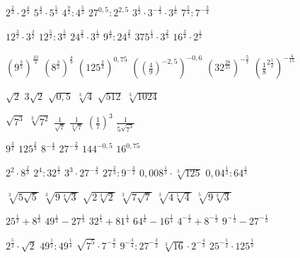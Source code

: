 \documentclass[12pt,a4paper]{article}
\begin{document}
	{$2^{\frac{2}{3}}\cdot 2^{\frac{4}{3}}$}
	{$5^{\frac{4}{3}}\cdot 5^{\frac{5}{3}}$}
	{$4^{\frac{9}{2}}:4^{\frac{5}{2}}$}
	{$27^{0{,}5}:2^{2{,}5}$}
	{$3^{\frac{1}{2}}\cdot 3^{-\frac{1}{3}}\cdot 3^{\frac{1}{6}}$}
	{$7^{\frac{5}{4}}:7^{-\frac{3}{4}}$}
	
	{$12^{\frac{3}{2}}\cdot 3^{\frac{3}{2}}$}
	{$12^{\frac{5}{2}}:3^{\frac{5}{2}}$}
	{$24^{\frac{2}{3}}\cdot 3^{\frac{1}{3}}$}
	{$9^{\frac{4}{3}}:24^{\frac{2}{3}}$}
	{$375^{\frac{1}{3}}\cdot 3^{\frac{2}{3}}$}
	{$16^{\frac{3}{4}}\cdot 2^{\frac{1}{2}}$}
	
	{$\left(9^{\frac{3}{5}}\right)^{\frac{10}{3}}$}
	{$\left(8^{\frac{3}{2}}\right)^{\frac{4}{9}}$}
	{$\left(125^{\frac{2}{3}}\right)^{0{,}75}$}
	{$\left(\left(\frac{4}{9}\right)^{-2{,}5}\right)^{-0{,}6}$}
	{$\left(32^{\frac{28}{25}}\right)^{-\frac{5}{7}}$}
	{$\left(\frac{1}{8}^{2\frac{1}{2}}\right)^{-\frac{4}{15}}$}
	
	\newpage

	{$\sqrt{2}$}
	{$3\sqrt{2}$}
	{$\sqrt{0{,}5}$}
	{$\sqrt[3]{4}$}
	{$\sqrt{512}$}
	{$\sqrt[3]{1024}$}
	
	{$\sqrt{7^3}$}
	{$\sqrt[3]{7^2}$}
	{$\frac{1}{\sqrt{7}}$}
	{$\frac{1}{\sqrt[3]{7}}$}
	{$\left(\frac{1}{7}\right)^3$}
	{$\frac{1}{5\sqrt{7^3}}$}
	
	{$9^{\frac{3}{2}}$}
	{$125^{\frac{2}{3}}$}
	{$8^{-\frac{4}{3}}$}
	{$27^{-\frac{2}{3}}$}
	{$144^{-0{,}5}$}
	{$16^{0{,}75}$}
	
	{$2^2\cdot 8^{\frac{2}{3}}$}
	{$2^4:32^{\frac{1}{5}}$}
	{$3^3\cdot 27^{-\frac{4}{3}}$}
	{$27^{\frac{2}{3}}:9^{-\frac{3}{2}}$}
	{$0{,}008^{\frac{1}{3}}\cdot\sqrt[3]{125}$}
	{$0{,}04^{\frac{1}{2}}:64^{\frac{1}{3}}$}
	
	{$\sqrt[3]{5\sqrt{5}}$}
	{$\sqrt[3]{9\sqrt[4]{3}}$}
	{$\sqrt{2\sqrt[3]{2}}$}
	{$\sqrt[3]{7\sqrt{7}}$}
	{$\sqrt[3]{4\sqrt[5]{4}}$}
	{$\sqrt[5]{9\sqrt[3]{3}}$}
	
	\zadanieDomowe
	
	
	{$25^{\frac{1}{2}}+8^{\frac{1}{3}}$}
	{$49^{\frac{1}{2}}-27^{\frac{1}{3}}$}
	{$32^{\frac{1}{5}}+81^{\frac{1}{4}}$}
	{$64^{\frac{1}{6}}-16^{\frac{1}{4}}$}
	{$4^{-\frac{1}{2}}+8^{-\frac{1}{3}}$}
	{$9^{-\frac{1}{2}}-27^{-\frac{1}{3}}$}
	
	
	{$2^{\frac{5}{2}}\cdot\sqrt{2}$}
	{$49^{\frac{1}{2}}:49^{\frac{1}{4}}$}
	{$\sqrt{7^5}\cdot 7^{-\frac{3}{2}}$}
	{$9^{-\frac{3}{4}}:27^{-\frac{3}{2}}$}
	{$\sqrt[3]{16}\cdot 2^{-\frac{4}{3}}$}
	{$25^{-\frac{1}{2}}\cdot 125^{\frac{1}{3}}$}
	
\end{document}
